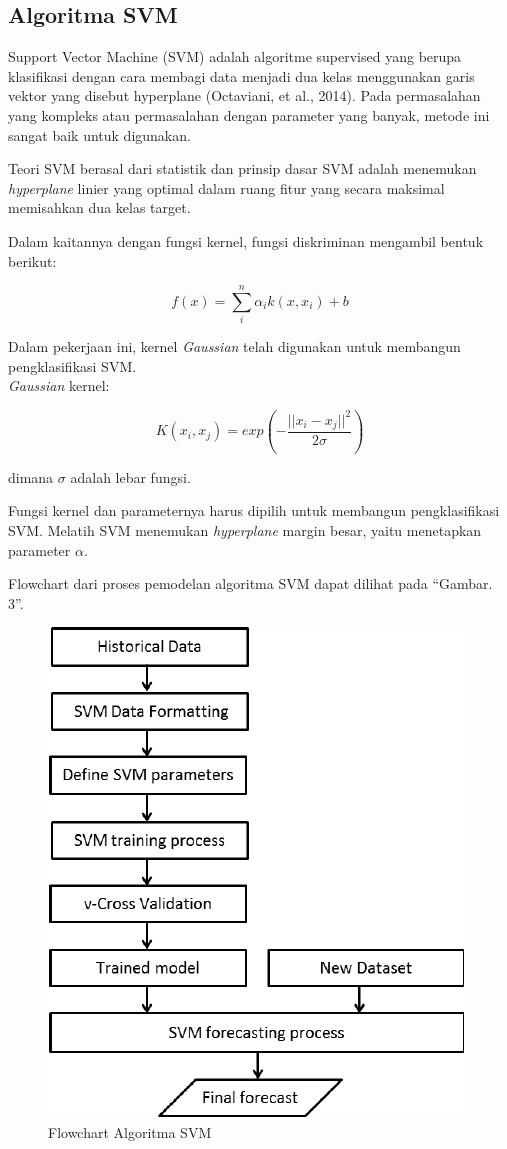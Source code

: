\documentclass[conference]{IEEEtran}
\begin{document}
\subsection{Algoritma SVM}
Support Vector Machine (SVM) adalah algoritme supervised yang berupa klasifikasi dengan cara membagi data menjadi dua kelas menggunakan garis vektor yang disebut hyperplane (Octaviani, et al., 2014). Pada permasalahan yang kompleks atau permasalahan dengan parameter yang banyak, metode ini sangat baik untuk digunakan.

Teori SVM berasal dari statistik dan prinsip dasar SVM adalah menemukan \emph{hyperplane} linier yang optimal dalam ruang fitur yang secara maksimal memisahkan dua kelas target.

Dalam kaitannya dengan fungsi kernel, fungsi diskriminan mengambil bentuk berikut:

\begin{equation*}
f(x) = \sum^{n}_i \alpha_ik(x,x_i)+b
\label{eq4}
\end{equation*}

Dalam pekerjaan ini, kernel \emph{Gaussian} telah digunakan
untuk membangun pengklasifikasi SVM.\\ \emph{Gaussian} kernel:

\begin{equation*}
K(x_i,x_j) = exp\left (- \frac{||x_i-x_j||^2}{2\sigma} \right )
\label{eq5}
\end{equation*}

\noindent dimana $\sigma$ adalah lebar fungsi.

Fungsi kernel dan parameternya harus dipilih untuk membangun pengklasifikasi SVM. Melatih SVM menemukan \emph{hyperplane} margin besar, yaitu menetapkan parameter $\alpha$.

Flowchart dari proses pemodelan algoritma SVM dapat dilihat pada ``Gambar. 3''.\vspace{6pt}

\begin{figure}
\centering
\includegraphics[width=.4\textwidth]{Gambar/gambar2.png}
\caption{Flowchart Algoritma SVM}
\end{figure}
\end{document}

